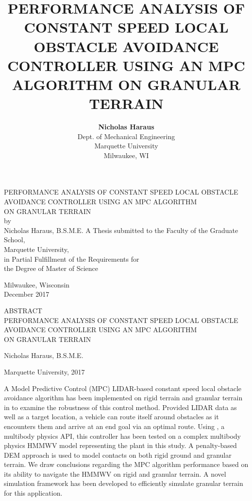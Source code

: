 \documentclass[12pt,onecolumn]{report}
\title{\myfont PERFORMANCE ANALYSIS OF CONSTANT SPEED LOCAL OBSTACLE AVOIDANCE CONTROLLER USING AN MPC ALGORITHM ON GRANULAR TERRAIN}
\author{
	{\bf Nicholas Haraus}\\
	Dept. of Mechanical Engineering\\
	Marquette University\\
	Milwaukee, WI
}
\newcommand{\CHRONO}{{\sffamily{{Chrono}}}}
\renewcommand{\headrulewidth}{0pt}
\begin{document}
\fancyhf{} %
\renewcommand{\headrulewidth}{0pt}

\onecolumn
\begin{singlespacing}
\begin{center}
PERFORMANCE ANALYSIS OF CONSTANT SPEED LOCAL OBSTACLE\\ AVOIDANCE CONTROLLER USING AN MPC ALGORITHM\\ ON GRANULAR TERRAIN
\\
\vfill
by\\
\vspace{0.1in}
Nicholas Haraus, B.S.M.E.
\vfill
A Thesis submitted to the Faculty of the Graduate School,\\
Marquette University,\\
in Partial Fulfillment of the Requirements for\\
the Degree of Master of Science

\vfill
Milwaukee, Wisconsin\\
\vspace{0.1in}
December 2017
\end{center}
\end{singlespacing}
\newpage

\begin{singlespacing}
\begin{center}

ABSTRACT\\
PERFORMANCE ANALYSIS OF CONSTANT SPEED LOCAL OBSTACLE\\ AVOIDANCE CONTROLLER USING AN MPC ALGORITHM\\ ON GRANULAR TERRAIN\\

\vspace{0.2in}

Nicholas Haraus, B.S.M.E.\\
\vspace{0.1in}

Marquette University, 2017
\end{center}

\vspace{0.2in}

A Model Predictive Control (MPC) LIDAR-based constant speed local obstacle avoidance algorithm has been implemented on rigid terrain and granular terrain in {\CHRONO} to examine the robustness of this control method. 
	Provided LIDAR data as well as a target location, a vehicle can route itself around obstacles as it encounters them and arrive at an end goal via an optimal route.
	Using {\CHRONO}, a multibody physics API, this controller has been tested on a complex multibody physics HMMWV model representing the plant in this study. A penalty-based DEM approach is used to model contacts on both rigid ground and granular terrain. We draw conclusions regarding the MPC algorithm performance based on its ability to navigate the {\CHRONO} HMMWV on rigid and granular terrain.  A novel simulation framework has been developed to efficiently simulate granular terrain for this application.
\vfill
\end{singlespacing}
\newpage
\end{document}
